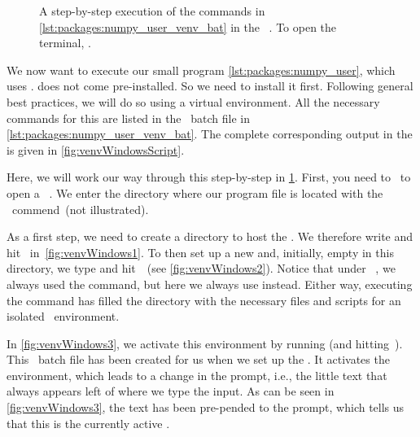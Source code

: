\begin{figure}
%
\floatRowSep%
%
%
%
\floatSep%
%
%
%
\caption{A step-by-step execution of the commands in \cref{lst:packages:numpy_user_venv_bat} in the \microsoftWindows\ . %
To open the terminal, \windowsTerminal.}%
\label{fig:venvWindows}%
\end{figure}%

We now want to execute our small program \cref{lst:packages:numpy_user}, which uses \numpy.
\numpy{} does not come pre-installed.
So we need to install it first.
Following general best practices, we will do so using a virtual environment.
All the necessary commands for this are listed in the \microsoftWindows\ batch file in \cref{lst:packages:numpy_user_venv_bat}.
The complete corresponding output in the  is given in \cref{fig:venvWindowsScript}.

Here, we will work our way through this step-by-step in \cref{fig:venvWindows}.
First, you need to \windowsTerminal\ to open a \microsoftWindows\ .
We enter the directory where our program file  is located with the ~commend~(not illustrated).

As a first step, we need to create a directory  to host the .
We therefore write  and hit~\keys{\return} in~\cref{fig:venvWindows1}.
To then set up a new and, initially, empty  in this directory, we type  and hit~\keys{\return}~(see \cref{fig:venvWindows2}).
Notice that under \ubuntu\ \linux, we always used the  command, but here we always use  instead.
Either way, executing the command has filled the directory  with the necessary files and scripts for an isolated \python\ environment.

In \cref{fig:venvWindows3}, we activate this environment by running  (and hitting~\keys{\return}).
This \microsoftWindows\ batch file has been created for us when we set up the .
It activates the environment, which leads to a change in the prompt, i.e., the little text that always appears left of where we type the input.
As can be seen in \cref{fig:venvWindows3}, the text  has been pre-pended to the prompt, which tells us that this is the currently active .

